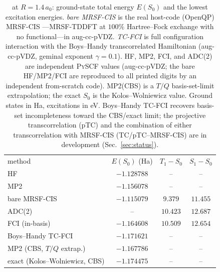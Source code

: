 \documentclass[aps,prb,reprint,superscriptaddress,floatfix]{revtex4-2}
\begin{document}
\begin{table}[t]
\caption{ at $R=1.4\,a_0$: ground-state total energy $E(S_0)$ and the lowest
excitation energies. \emph{bare MRSF-CIS} is the real host-code (OpenQP) MRSF-CIS
---MRSF-TDDFT at $100\%$ Hartree--Fock exchange with no functional---in aug-cc-pVDZ.
\emph{TC-FCI} is full configuration interaction with the Boys--Handy transcorrelated
Hamiltonian (aug-cc-pVDZ, geminal exponent $\gamma{=}0.1$). HF, MP2, FCI, and ADC(2)
are independent \textsc{PySCF} values (aug-cc-pVDZ; the bare HF/MP2/FCI are reproduced
to all printed digits by an independent from-scratch code). MP2(CBS) is a $T/Q$
basis-set-limit extrapolation; the exact $S_0$ is the Kolos--Wolniewicz value. Ground
states in Ha, excitations in eV. Boys--Handy TC-FCI recovers basis-set incompleteness
toward the CBS/exact limit; the projective transcorrelation (pTC) and the combination
of either transcorrelation with MRSF-CIS (TC/pTC--MRSF-CIS) are in development
(Sec.~\ref{sec:status}).}
\label{tab:h2}
\begin{ruledtabular}
\begin{tabular}{lccc}
method & $E(S_0)$ (Ha) & $T_1{-}S_0$ & $S_1{-}S_0$ \\
\colrule
HF                       & $-1.128788$ & --       & --       \\
MP2                      & $-1.156078$ & --       & --       \\
bare MRSF-CIS            & $-1.115079$ & $9.379$  & $11.455$ \\
ADC(2)                   & --          & $10.423$ & $12.687$ \\
FCI (in-basis)           & $-1.164608$ & $10.509$ & $12.654$ \\
Boys--Handy TC-FCI       & $-1.171621$ & --       & --       \\
MP2 (CBS, $T/Q$ extrap.) & $-1.167786$ & --       & --       \\
\colrule
exact (Kolos--Wolniewicz, CBS) & $-1.174475$ & --  & --       \\
\end{tabular}
\end{ruledtabular}
\end{table}
\end{document}
